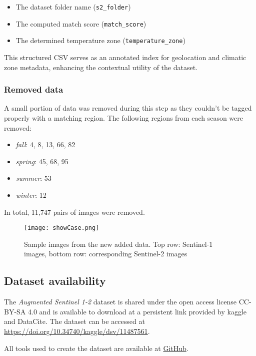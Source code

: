 \begin{itemize}
    \item The dataset folder name (\texttt{s2\_folder})
    \item The computed match score (\texttt{match\_score})
    \item The determined temperature zone (\texttt{temperature\_zone})
\end{itemize}

This structured CSV serves as an annotated index for geolocation and climatic zone metadata, enhancing the contextual utility of the dataset.

\subsubsection{Removed data}
A small portion of data was removed during this step as they couldn't be tagged properly with a matching region. The following regions from each season were removed: 

\begin{itemize}
    \item \textit{fall}: 4, 8, 13, 66, 82
    \item \textit{spring}: 45, 68, 95
    \item \textit{summer}: 53
    \item \textit{winter}: 12
\end{itemize}

In total, 11,747 pairs of images were removed.

\begin{figure*}[t]
    \texttt{[image: showCase.png]}
    \caption{Sample images from the new added data. Top row: Sentinel-1 images, bottom row: corresponding Sentinel-2 images}
    \label{fig:showCase}
\end{figure*}

\subsection{Dataset availability}
The \textit{Augmented Sentinel 1-2} dataset is shared under the open access license CC-BY-SA 4.0 and is available to download at a persistent link provided by kaggle and DataCite. The dataset can be accessed at \url{https://doi.org/10.34740/kaggle/dsv/11487561}.

All tools used to create the dataset are available at \href{https://github.com/ShambaC/Augmented-SEN-1-2}{GitHub}.